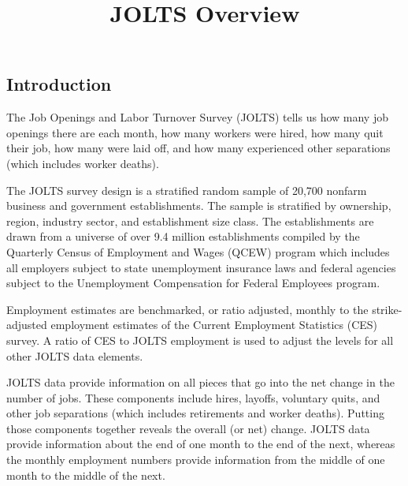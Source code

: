 \documentclass[
  11pt,
]{article}
\title{JOLTS Overview}
\author{}
\date{\vspace{-2.5em}}
\begin{document}
\maketitle

\hypertarget{introduction}{%
\subsection{Introduction}\label{introduction}}

The Job Openings and Labor Turnover Survey (JOLTS) tells us how many job
openings there are each month, how many workers were hired, how many
quit their job, how many were laid off, and how many experienced other
separations (which includes worker deaths).

The JOLTS survey design is a stratified random sample of 20,700 nonfarm
business and government establishments. The sample is stratified by
ownership, region, industry sector, and establishment size class. The
establishments are drawn from a universe of over 9.4 million
establishments compiled by the Quarterly Census of Employment and Wages
(QCEW) program which includes all employers subject to state
unemployment insurance laws and federal agencies subject to the
Unemployment Compensation for Federal Employees program.

Employment estimates are benchmarked, or ratio adjusted, monthly to the
strike-adjusted employment estimates of the Current Employment
Statistics (CES) survey. A ratio of CES to JOLTS employment is used to
adjust the levels for all other JOLTS data elements.

JOLTS data provide information on all pieces that go into the net change
in the number of jobs. These components include hires, layoffs,
voluntary quits, and other job separations (which includes retirements
and worker deaths). Putting those components together reveals the
overall (or net) change. JOLTS data provide information about the end of
one month to the end of the next, whereas the monthly employment numbers
provide information from the middle of one month to the middle of the
next.
\end{document}
